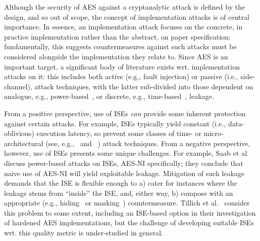 
Although the security of AES against a cryptanalytic attack is defined by
the design, and so out of scope, the concept of implementation attacks is
of central importance.
In essence, an implementation attack focuses on
the concrete, in practice implementation
rather than
the abstract, on paper     specification:
fundamentally, this suggests countermeasures against such attacks must be
considered alongside the implementation they relate to.
Since AES is an important target, a significant body of literature exists
wrt. implementation attacks on it: this includes both
 active (e.g., fault injection)
or
passive (i.e., side-channel),
attack techniques,
with the latter sub-divided into those dependent on
analogue,
e.g., power-based~\cite{ManOswPop:07},
or
discrete, 
e.g.,  time-based~\cite{KoeQui:99},
leakage.

From a positive perspective, use of ISEs
{\em can} provide some inherent protection against certain attacks.
For example,
ISEs typically yield constant (i.e., data-oblivious) execution latency,
so prevent some classes of time- or micro-architectural
(see, e.g.,~\cite[Section 4]{Szefer:19} and ~\cite[Section 4]{GYCH:18})
attack techniques.
From a negative perspective, however,
use of ISEs presents some unique challenges.
For example, 
Saab et al.\cite{SaaRohHam:16}
discuss power-based attacks on ISEs, AES-NI specifically; they conclude
that naive use of AES-NI will yield exploitable leakage.  Mitigation of
such leakage demands that the ISE is flexible enough to 
a) cater for instances where the leakage stems from ``inside'' the ISE,
   and, either way,
b) compose with an appropriate
   (e.g., hiding~\cite[Chapter 7]{ManOswPop:07} or masking~\cite[Chapter 10]{ManOswPop:07})
   countermeasure.
Tillich et al.~\cite{TilHerMan:07}
consider this problem to some extent, including an ISE-based option in
their investigation of hardened AES implementations, but the challenge
of developing suitable ISEs wrt. this quality metric is under-studied
in general.

